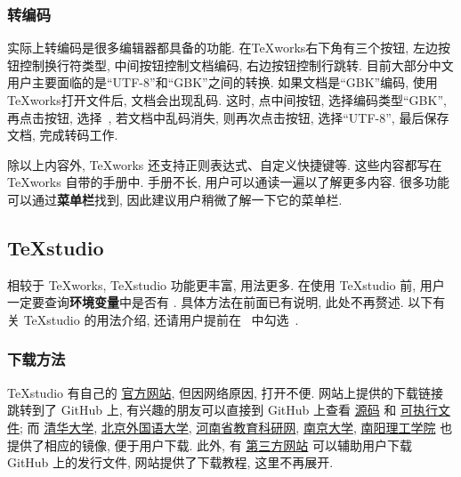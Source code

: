 \subsubsection{转编码}

实际上转编码是很多编辑器都具备的功能.
在\TeX works右下角有三个按钮,
左边按钮控制换行符类型, 中间按钮控制文档编码, 右边按钮控制行跳转.
目前大部分中文用户主要面临的是``UTF-8''和``GBK''之间的转换.
如果文档是``GBK''编码, 使用\TeX works打开文件后, 文档会出现乱码.
这时, 点中间按钮, 选择编码类型``GBK'', 再点击按钮,
选择\ , 若文档中乱码消失, 则再次点击按钮,
选择``UTF-8'', 最后保存文档, 完成转码工作.

除以上内容外, \TeX works 还支持正则表达式、自定义快捷键等.
这些内容都写在 \TeX works 自带的手册中.
手册不长, 用户可以通读一遍以了解更多内容.
很多功能可以通过\textbf{菜单栏}找到,
因此建议用户稍微了解一下它的菜单栏.

\subsection{\TeX studio}\label{subsec:texstudio}

相较于 \TeX works, \TeX studio 功能更丰富, 用法更多.
在使用 \TeX studio 前,
用户一定要查询\textbf{环境变量}中是否有 .
具体方法在前面已有说明, 此处不再赘述.
以下有关 \TeX studio 的用法介绍,
还请用户提前在\  中勾选\ .

\subsubsection{下载方法}

\TeX studio 有自己的%
\href{http://texstudio.sourceforge.net/}{官方网站},
但因网络原因,
打开不便.
网站上提供的下载链接跳转到了 GitHub 上,
有兴趣的朋友可以直接到 GitHub 上查看%
\href{https://github.com/texstudio-org/texstudio}{源码}%
和%
\href{https://github.com/texstudio-org/texstudio/releases}{可执行文件};
而%
\href{https://mirrors.tuna.tsinghua.edu.cn/github-release/texstudio-org/texstudio/LatestRelease/}{清华大学},
\href{https://mirrors.bfsu.edu.cn/github-release/texstudio-org/texstudio/LatestRelease/}{北京外国语大学},
\href{https://mirrors.ha.edu.cn/github-release/texstudio-org/texstudio/LatestRelease/}{河南省教育科研网},
\href{https://mirror.nju.edu.cn/github-release/texstudio-org/texstudio/LatestRelease/}{南京大学},
\href{https://mirror.nyist.edu.cn/github-release/texstudio-org/texstudio/LatestRelease/}{南阳理工学院}%
也提供了相应的镜像,
便于用户下载.
此外,
有%
\href{https://d.serctl.com/}{第三方网站}%
可以辅助用户下载 GitHub 上的发行文件,
网站提供了下载教程,
这里不再展开.

